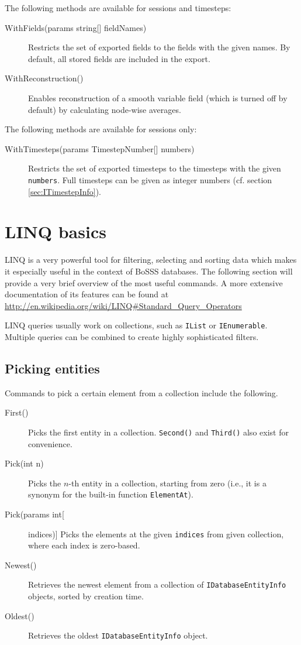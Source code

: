 The following methods are available for sessions and timesteps:
\begin{description}
	\item[WithFields(params string{[}{]} fieldNames)]
	Restricts the set of exported fields to the fields with the given names. By default, all stored fields are included in the export.
	
	\item[WithReconstruction()]
	Enables reconstruction of a smooth variable field (which is turned off by default) by calculating node-wise averages.
\end{description}

The following methods are available for sessions only:
\begin{description}
	\item[WithTimesteps(params TimestepNumber{[}{]} numbers)]
	Restricts the set of exported timesteps to the timesteps with the given \lstinline{numbers}. Full timesteps can be given as integer numbers (cf. section \ref{sec:ITimestepInfo}).
\end{description}


\section{LINQ basics}
LINQ is a very powerful tool for filtering, selecting and sorting data which makes it especially useful in the context of BoSSS databases.
The following section will provide a very brief overview of the most useful commands. A more extensive documentation of its features can be found at
\url{http://en.wikipedia.org/wiki/LINQ#Standard\_Query\_Operators}

LINQ queries usually work on collections, such as \lstinline{IList} or \lstinline{IEnumerable}.
Multiple queries can be combined to create highly sophisticated filters.

\subsection{Picking entities}
Commands to pick a certain element from a collection include the following.
\begin{description}
	\item[First()]
	Picks the first entity in a collection. \lstinline{Second()} and \lstinline{Third()} also exist for convenience.
	
	\item[Pick(int n)]
	Picks the $n$-th entity in a collection, starting from zero (i.e., it is a synonym for the built-in function \lstinline{ElementAt}).
	
	\item[Pick(params int[] indices)]
	Picks the elements at the given \lstinline{indices} from given collection, where each index is zero-based.
	
	\item[Newest()]
	Retrieves the newest element from a collection of \lstinline{IDatabaseEntityInfo} objects, sorted by creation time.
	
	\item[Oldest()]
	Retrieves the oldest \lstinline{IDatabaseEntityInfo} object.
\end{description}

